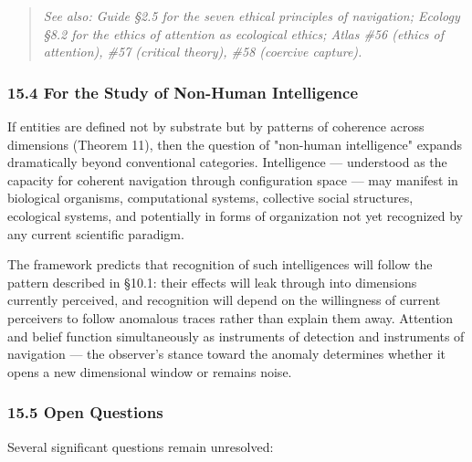 \begin{quote}
\itshape
\textit{See also: Guide §2.5 for the seven ethical principles of navigation; Ecology §8.2 for the ethics of attention as ecological ethics; Atlas \#56 (ethics of attention), \#57 (critical theory), \#58 (coercive capture).}
\end{quote}


\subsubsection*{15.4 For the Study of Non-Human Intelligence}


If entities are defined not by substrate but by patterns of coherence across dimensions (Theorem 11), then the question of "non-human intelligence" expands dramatically beyond conventional categories. Intelligence — understood as the capacity for coherent navigation through configuration space — may manifest in biological organisms, computational systems, collective social structures, ecological systems, and potentially in forms of organization not yet recognized by any current scientific paradigm.


The framework predicts that recognition of such intelligences will follow the pattern described in §10.1: their effects will leak through into dimensions currently perceived, and recognition will depend on the willingness of current perceivers to follow anomalous traces rather than explain them away. Attention and belief function simultaneously as instruments of detection and instruments of navigation — the observer's stance toward the anomaly determines whether it opens a new dimensional window or remains noise.


\subsubsection*{15.5 Open Questions}


Several significant questions remain unresolved:


